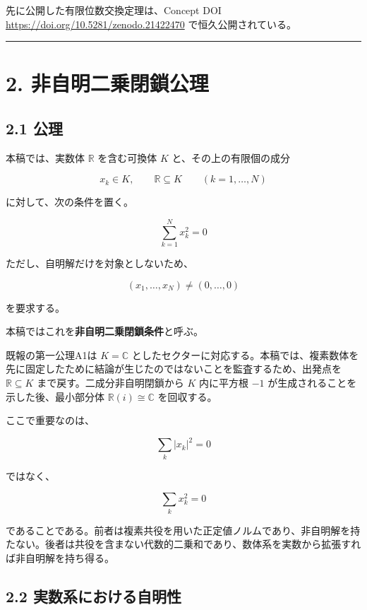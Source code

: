 \documentclass[
  a4paper,
  10pt]{article}
\begin{document}
先に公開した有限位数交換定理は、Concept DOI
\url{https://doi.org/10.5281/zenodo.21422470} で恒久公開されている。

\begin{center}\rule{0.5\linewidth}{0.5pt}\end{center}

\section{2.
非自明二乗閉鎖公理}\label{2-ux975eux81eaux660eux4e8cux4e57ux9589ux9396ux516cux7406}

\subsection{2.1 公理}\label{21-ux516cux7406}

本稿では、実数体 \(\mathbb R\) を含む可換体 \(K\)
と、その上の有限個の成分

\[
x_k\in K,
\qquad
\mathbb R\subseteq K
\qquad(k=1,\ldots,N)
\]

に対して、次の条件を置く。

\[
\boxed{
\sum_{k=1}^{N}x_k^2=0
}
\]

ただし、自明解だけを対象としないため、

\[
\boxed{
(x_1,\ldots,x_N)\neq(0,\ldots,0)
}
\]

を要求する。

本稿ではこれを\textbf{非自明二乗閉鎖条件}と呼ぶ。

既報の第一公理A1は \(K=\mathbb C\)
としたセクターに対応する。本稿では、複素数体を先に固定したために結論が生じたのではないことを監査するため、出発点を
\(\mathbb R\subseteq K\) まで戻す。二成分非自明閉鎖から \(K\) 内に平方根
\(-1\) が生成されることを示した後、最小部分体
\(\mathbb R(i)\cong\mathbb C\) を回収する。

ここで重要なのは、

\[
\sum_k|x_k|^2=0
\]

ではなく、

\[
\sum_kx_k^2=0
\]

であることである。前者は複素共役を用いた正定値ノルムであり、非自明解を持たない。後者は共役を含まない代数的二乗和であり、数体系を実数から拡張すれば非自明解を持ち得る。

\subsection{2.2
実数系における自明性}\label{22-ux5b9fux6570ux7cfbux306bux304aux3051ux308bux81eaux660eux6027}
\end{document}
